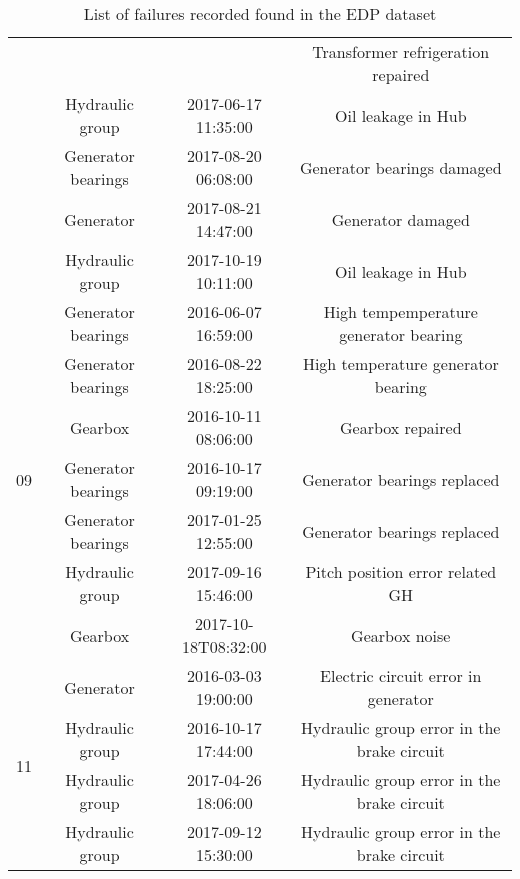 \begin{table}[H]
\begin{tabular}{|c|c|c|c|}
    & & & Transformer refrigeration repaired \\
    & Hydraulic group & 2017-06-17 11:35:00 & Oil leakage in Hub \\
    & Generator bearings & 2017-08-20 06:08:00 & Generator bearings damaged \\
    & Generator & 2017-08-21 14:47:00 & Generator damaged \\
    & Hydraulic group & 2017-10-19 10:11:00 & Oil leakage in Hub \\
    \hline
    \multirow{7}{*}{09} & Generator bearings & 2016-06-07 16:59:00 & High tempemperature generator bearing \\
    & Generator bearings & 2016-08-22 18:25:00 & High temperature generator bearing \\
    & Gearbox & 2016-10-11 08:06:00 & Gearbox repaired \\
    & Generator bearings & 2016-10-17 09:19:00 & Generator bearings replaced \\
    & Generator bearings & 2017-01-25 12:55:00 & Generator bearings replaced \\
    & Hydraulic group & 2017-09-16 15:46:00 & Pitch position error related GH \\
    & Gearbox & 2017-10-18T08:32:00 & Gearbox noise \\
    \hline
    \multirow{4}{*}{11} & Generator & 2016-03-03 19:00:00 & Electric circuit error in generator \\
    & Hydraulic group & 2016-10-17 17:44:00 & Hydraulic group error in the brake circuit \\
    & Hydraulic group & 2017-04-26 18:06:00 & Hydraulic group error in the brake circuit \\
    & Hydraulic group & 2017-09-12 15:30:00 & Hydraulic group error in the brake circuit \\
    \hline
    \end{tabular}
    \caption{List of failures recorded found in the EDP dataset}
        \label{tab:failures}
\end{table}
